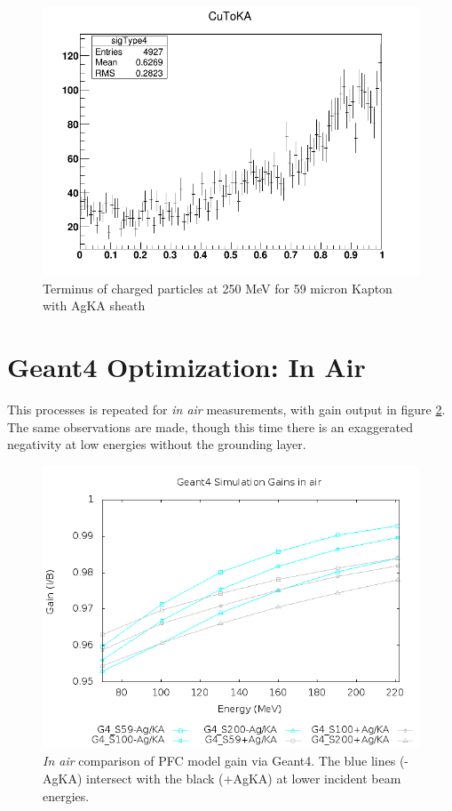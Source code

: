 \documentclass{article}
\begin{document}
\begin{figure}[H]
\centering
\includegraphics[width=6in]{figures/Cu_KA_AgKA_vac/S59/CutoKA.png}
\caption{Terminus of charged particles at 250 MeV for 59 micron Kapton with AgKA sheath}
\label{fig:G4_stats_AgKA_vac_c}
\end{figure}

\newpage
\section{Geant4 Optimization: In Air}

This processes is repeated for \emph{in air} measurements, with gain output in figure \ref{fig:G4_results_air}.  The same observations are made, though this time there is an exaggerated negativity at low energies without the grounding layer.

\begin{figure}[H]
  \centering
  \includegraphics[width=5in]{figures/fig_G4_results_air.png}
  \caption{\emph{In air} comparison of PFC model gain via Geant4.  The blue lines (-AgKA) intersect with the black (+AgKA) at lower incident beam energies.} 
  \label{fig:G4_results_air}
\end{figure}
\end{document}
